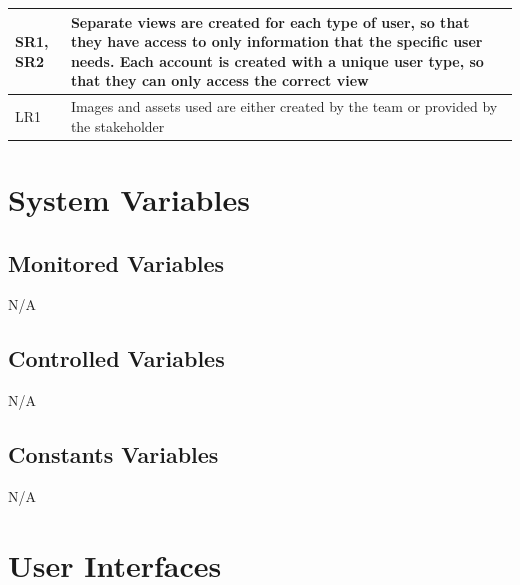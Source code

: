 \documentclass[12pt, titlepage]{article}
\begin{document}
\begin{table}[H]
\begin{tabular}{|p{}|p{}|}
		\hline
		SR1, SR2             & Separate views are created for each type of user, so that they have access to only information that the specific user needs. Each account is created with a unique user type, so that they can only access the correct view \\
		\hline
		LR1                  & Images and assets used are either created by the team or provided by the stakeholder                                                                                                                                        \\
		\hline
	\end{tabular}
\end{table}

\section{System Variables}
\subsection{Monitored Variables}
N/A

\subsection{Controlled Variables}
N/A

\subsection{Constants Variables}
N/A

\section{User Interfaces}

\end{document}
